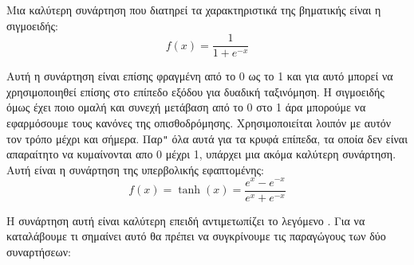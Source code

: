 Μια καλύτερη συνάρτηση που διατηρεί τα χαρακτηριστικά της βηματικής είναι η σιγμοειδής:
$$f(x)=\frac{1}{1+e^{-x}}$$
\begin{figure}[H]
    \centering
    \caption{}
\end{figure}
Αυτή η συνάρτηση είναι επίσης φραγμένη από το 0 ως το 1 και για αυτό μπορεί να χρησιμοποιηθεί επίσης στο επίπεδο εξόδου για δυαδική ταξινόμηση. Η σιγμοειδής όμως έχει ποιο ομαλή και συνεχή μετάβαση από το 0 στο 1 άρα μπορούμε να εφαρμόσουμε
τους κανόνες της οπισθοδρόμησης. Χρησιμοποιείται λοιπόν με αυτόν τον τρόπο μέχρι και σήμερα. Παρ\texttt{"} όλα αυτά για τα κρυφά επίπεδα, τα οποία δεν είναι απαραίτητο να κυμαίνονται απο 0 μέχρι 1, υπάρχει μια ακόμα καλύτερη συνάρτηση. Αυτή είναι η
συνάρτηση της υπερβολικής εφαπτομένης:
$$f(x)=\tanh (x)=\frac{e^x-e^{-x}}{e^x+e^{-x}}$$
\begin{figure}[H]
    \centering
    \caption{}
\end{figure}
Η συνάρτηση αυτή είναι καλύτερη επειδή αντιμετωπίζει το λεγόμενο . Για να καταλάβουμε τι σημαίνει αυτό θα πρέπει να συγκρίνουμε τις παραγώγους των δύο συναρτήσεων:
